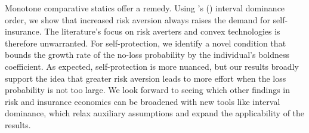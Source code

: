 \documentclass[11pt]{article}
\begin{document}
Monotone comparative statics offer a remedy. Using \citeauthor{quah2009comparative}'s (\citeyear{quah2009comparative}) interval dominance order, we show that increased risk aversion always raises the demand for self-insurance. The literature’s focus on risk averters and convex technologies is therefore unwarranted. For self-protection, we identify a novel condition that bounds the growth rate of the no-loss probability by the individual’s boldness coefficient. As expected, self-protection is more nuanced, but our results broadly support the idea that greater risk aversion leads to more effort when the loss probability is not too large. We look forward to seeing which other findings in risk and insurance economics can be broadened with new tools like interval dominance, which relax auxiliary assumptions and expand the applicability of the results.
%
%
%	
%
%
%
%
%
%
\end{document}
